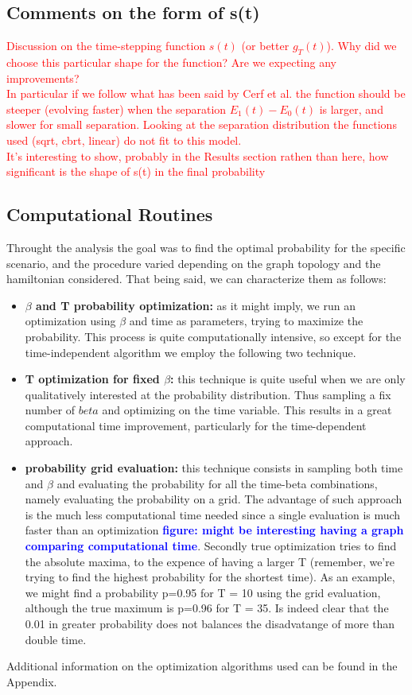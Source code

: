 \documentclass[aps,pra,reprint, onecolumn, showkeys]{revtex4-2}
\newcommand{\red}[1]{\textcolor{red}{#1}}
\newcommand{\blue}[1]{\textcolor{blue}{\textbf{figure: #1}}}
\begin{document}
\subsection{Comments on the form of s(t)}
\red{Discussion on the time-stepping function $s(t)$ (or better  $g_T(t)$). Why did we choose this particular shape for the function? Are we expecting any improvements? \\ In particular if we follow what has been said by Cerf et al. the function should be steeper (evolving faster) when the separation $E_1(t)-E_0(t)$ is larger, and slower for small separation. Looking at the separation distribution the functions used (sqrt, cbrt, linear) do not fit to this model. \\ It's interesting to show, probably in the Results section rathen than here, how significant is the shape of s(t) in the final probability}


\subsection{Computational Routines}
Throught the analysis the goal was to find the optimal probability for the specific scenario, and the procedure varied depending on the graph topology and the hamiltonian considered. That being said, we can characterize them as follows:
\begin{itemize}
  \item \textbf{$\beta$ and T probability optimization:} as it might imply, we run an optimization using $\beta$ and time as parameters, trying to maximize the probability. This process is quite computationally intensive, so except for the time-independent algorithm we employ the following two technique.
  \item \textbf{T optimization for fixed $\beta$:} this technique is quite useful when we are only qualitatively interested at the probability distribution. Thus sampling a fix number of $beta$ and optimizing on the time variable. This results in a great computational time improvement, particularly for the time-dependent approach.
  \item \textbf{probability grid evaluation:} this technique consists in sampling both time and $\beta$ and evaluating the probability for all the time-beta combinations, namely evaluating the probability on a grid. The advantage of such approach is the much less computational time needed since a single evaluation is much faster than an optimization \blue{might be interesting having a graph comparing computational time}. Secondly true optimization tries to find the absolute maxima, to the expence of having a larger T (remember, we're trying to find the highest probability for the shortest time). As an example, we might find a probability p=0.95 for T = 10 using the grid evaluation, although the true maximum is p=0.96 for T = 35. Is indeed clear that the 0.01 in greater probability does not balances the disadvatange of more than double time.
\end{itemize}
Additional information on the optimization algorithms used can be found in the Appendix.
\end{document}

